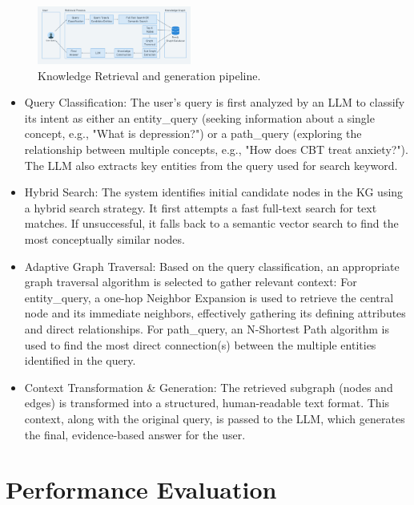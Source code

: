 \documentclass[conference]{IEEEtran}
\begin{document}
\begin{figure}[htbp]
    \centerline{\includegraphics[width=0.45\textwidth]{knowledge-retrieval-pipeline.png}}
    \caption{Knowledge Retrieval and generation pipeline.}
    \label{fig:knowledge-retrieval-pipeline}
\end{figure}

\begin{itemize}
    \item Query Classification: The user's query is first analyzed by an LLM to classify its intent as either an entity\_query (seeking information about a single concept, e.g., "What is depression?") or a path\_query (exploring the relationship between multiple concepts, e.g., "How does CBT treat anxiety?").
          The LLM also extracts key entities from the query used for search keyword.

    \item Hybrid Search: The system identifies initial candidate nodes in the KG using a hybrid search strategy.
          It first attempts a fast full-text search for text matches.
          If unsuccessful, it falls back to a semantic vector search to find the most conceptually similar nodes.

    \item Adaptive Graph Traversal: Based on the query classification, an appropriate graph traversal algorithm is selected to gather relevant context:
          For entity\_query, a one-hop Neighbor Expansion is used to retrieve the central node and its immediate neighbors, effectively gathering its defining attributes and direct relationships.
          For path\_query, an N-Shortest Path algorithm is used to find the most direct connection(s) between the multiple entities identified in the query.

    \item Context Transformation \& Generation: The retrieved subgraph (nodes and edges) is transformed into a structured, human-readable text format. This context, along with the original query, is passed to the LLM, which generates the final, evidence-based answer for the user.
\end{itemize}

\section{Performance Evaluation}
\end{document}
